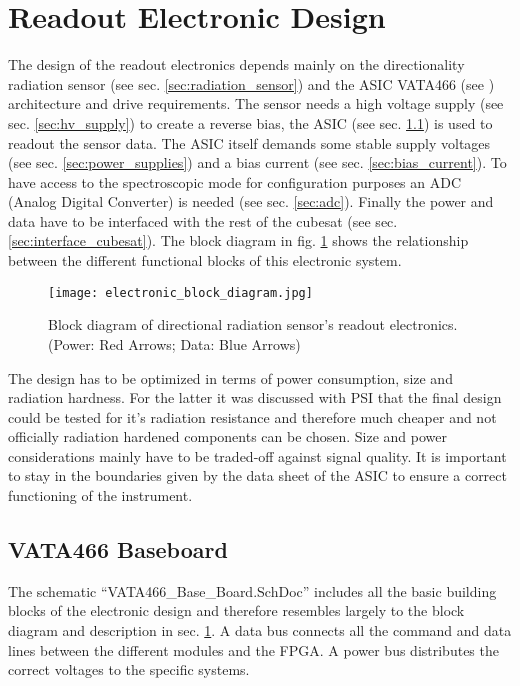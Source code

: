 \section{Readout Electronic Design}
\label{sec:electronic_design}
The design of the readout electronics depends mainly on the directionality radiation sensor (see sec. \ref{sec:radiation_sensor}) and the ASIC VATA466 (see \cite{Meier2016VATA466}) architecture and drive requirements.
The sensor needs a high voltage supply (see sec. \ref{sec:hv_supply}) to create a reverse bias, the ASIC (see sec. \ref{sec:vata466_baseboard}) is used to readout the sensor data.
The ASIC itself demands some stable supply voltages (see sec. \ref{sec:power_supplies}) and a bias current (see sec. \ref{sec:bias_current}).
To have access to the spectroscopic mode for configuration purposes an ADC (Analog Digital Converter) is needed (see sec. \ref{sec:adc}).
Finally the power and data have to be interfaced with the rest of the cubesat (see sec. \ref{sec:interface_cubesat}).
The block diagram in fig. \ref{fig:electronic_block_diagram} shows the relationship between the different functional blocks of this electronic system.
\begin{figure}[H]
    \centering
    \texttt{[image: electronic\_block\_diagram.jpg]}
    \caption[Block Diagram Readout Electronics]{Block diagram of directional radiation sensor's readout electronics. \\    (Power: Red Arrows; Data: Blue Arrows)}
    \label{fig:electronic_block_diagram}
\end{figure}

The design has to be optimized in terms of power consumption, size and radiation hardness. 
For the latter it was discussed with PSI that the final design could be tested for it's radiation resistance and therefore much cheaper and not officially radiation hardened components can be chosen.
Size and power considerations mainly have to be traded-off against signal quality.
It is important to stay in the boundaries given by the data sheet of the ASIC to ensure a correct functioning of the instrument.


\subsection{VATA466 Baseboard}
\label{sec:vata466_baseboard}
The schematic ``VATA466\_Base\_Board.SchDoc'' includes all the basic building blocks of the electronic design and therefore resembles largely to the block diagram and description in sec. \ref{sec:electronic_design}.
A data bus connects all the command and data lines between the different modules and the FPGA.
A power bus distributes the correct voltages to the specific systems.


